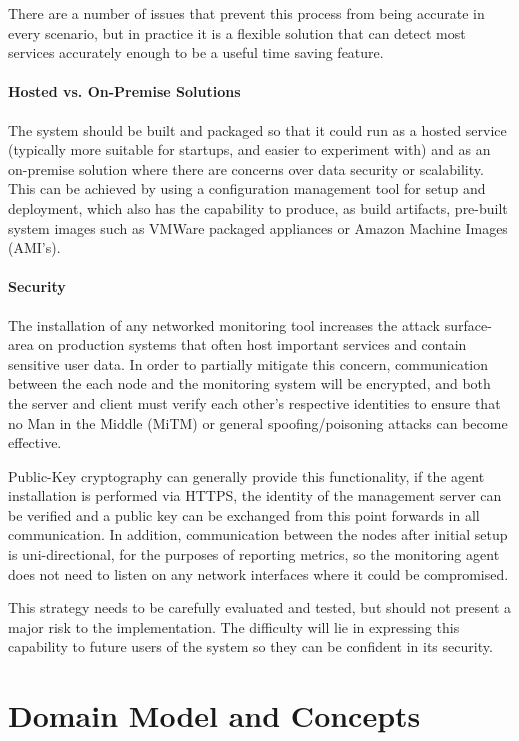 \documentclass{cshonours}
\begin{document}
There are a number of issues that prevent this process from being accurate in every scenario, but in practice it is a flexible solution that can detect most services accurately enough to be a useful time saving feature.

\paragraph{Hosted vs. On-Premise Solutions} The system should be built and packaged so that it could run as a hosted service (typically more suitable for startups, and easier to experiment with) and as an on-premise solution where there are concerns over data security or scalability. This can be achieved by using a configuration management tool for setup and deployment, which also has the capability to produce, as build artifacts, pre-built system images such as VMWare packaged appliances or Amazon Machine Images (AMI's).

\paragraph{Security} The installation of any networked monitoring tool increases the attack surface-area on production systems that often host important services and contain sensitive user data. In order to partially mitigate this concern, communication between the each node and the monitoring system will be encrypted, and both the server and client must verify each other’s respective identities to ensure that no Man in the Middle (MiTM) or general spoofing/poisoning attacks can become effective.

Public-Key cryptography can generally provide this functionality, if the agent installation is performed via HTTPS, the identity of the management server can be verified and a public key can be exchanged from this point forwards in all communication. In addition, communication between the nodes after initial setup is uni-directional, for the purposes of reporting metrics, so the monitoring agent does not need to listen on any network interfaces where it could be compromised.

This strategy needs to be carefully evaluated and tested, but should not present a major risk to the implementation. The difficulty will lie in expressing this capability to future users of the system so they can be confident in its security.

\pagebreak
\section{Domain Model and Concepts}
\end{document}
